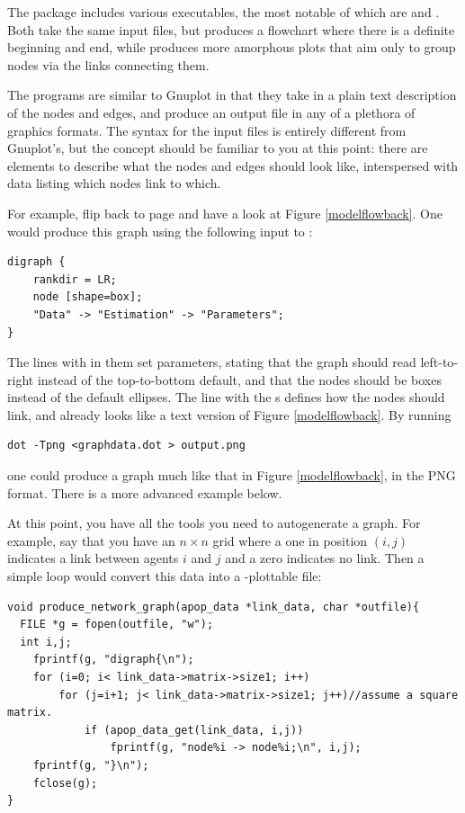The package includes various executables, the most notable of which are
 and . Both take the same input files, but 
produces a flowchart where there is a definite beginning and end, while
 produces more amorphous plots that aim only to group nodes
via the links connecting them. 

The programs are similar to Gnuplot in that they take in a plain text
description of the nodes and edges, and produce an output file in any of
a plethora of graphics formats.  The syntax for the input files is 
entirely different from Gnuplot's, but the concept should be familiar to
you at this point: there are elements to describe what the nodes and
edges should look like, interspersed with data listing which nodes link
to which. 

For example, flip back to page \pageref{modelflowback} and have a look at
Figure \ref{modelflowback}. One would produce this graph using the following
input to :

\begin{lstlisting}
digraph {
    rankdir = LR;
    node [shape=box];
    "Data" -> "Estimation" -> "Parameters";
}
\end{lstlisting}
The lines with \ci{=} in them set parameters, stating that the
graph should read left-to-right instead of the top-to-bottom
default, and that the nodes should be boxes instead of the default
ellipses. The line with the \ci{->}s defines how the nodes should link,
and already looks like a text version of Figure \ref{modelflowback}.  By running
\begin{lstlisting}
dot -Tpng <graphdata.dot > output.png
\end{lstlisting}
one could produce a graph much like that in Figure \ref{modelflowback},
in the PNG format. There is a more advanced example below.

At this point, you have all the tools you need to autogenerate a graph.
For example, say that you have an $n \times n$ grid where a
one in position $(i,j)$ indicates a link between agents $i$ and $j$ and
a zero indicates no link.
Then a simple  loop would convert this data into a
-plottable file:\label{netlisting}
\begin{lstlisting}
void produce_network_graph(apop_data *link_data, char *outfile){
  FILE *g = fopen(outfile, "w");
  int i,j;
    fprintf(g, "digraph{\n");
    for (i=0; i< link_data->matrix->size1; i++)
        for (j=i+1; j< link_data->matrix->size1; j++)//assume a square matrix.
            if (apop_data_get(link_data, i,j))
                fprintf(g, "node%i -> node%i;\n", i,j);
    fprintf(g, "}\n");
    fclose(g);
}
\end{lstlisting}

